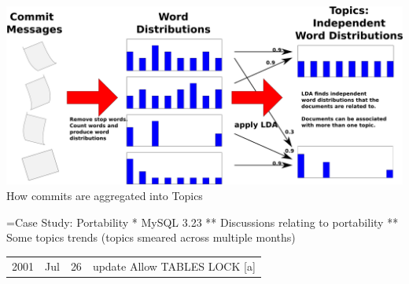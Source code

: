 \documentclass[titlepage,usenames,a4,landscape,semhelv]{seminar}
\begin{document}
\begin{slide}


\newslide

\begin{specquotei}
\begin{center}
\noindent
\includegraphics[width=1.25\textwidth]{commit-to-topics} \\
{How commits are aggregated into Topics}
\end{center}
\end{specquotei}

=Case Study: Portability
* MySQL 3.23 
** Discussions relating to portability
** Some topics trends (topics smeared across multiple months)


\newslide

\begin{specquotef}
\centering
\begin{tabular}{|ccc|l|}

\hline
2001 &  Jul &  26 &    update Allow TABLES LOCK [a] \\ 


\end{tabular}
\end{specquotef}
\end{slide}
\end{document}

